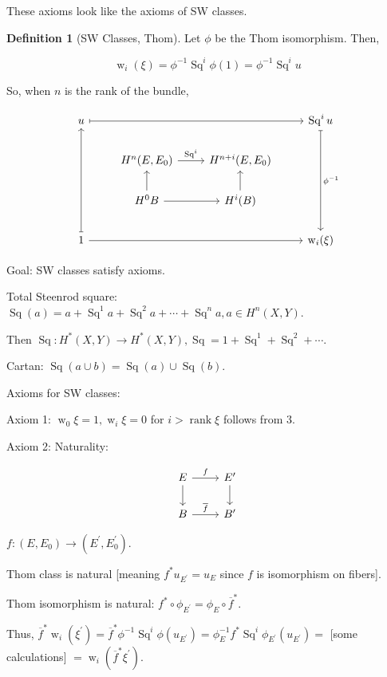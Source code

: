 \documentclass{article}
\theoremstyle{definition}
\newtheorem*{definition}{Definition}
\begin{document}
    These axioms look like the axioms of SW classes.

    \begin{definition}
        [SW Classes, Thom]

        Let \(\phi\) be the Thom isomorphism. Then,

        \[
            \operatorname{w}_i(\xi) = \phi ^{-1} \operatorname{Sq}^i \phi (1) = \phi ^{-1} \operatorname{Sq}^i u
        \]
    \end{definition}

    So, when \(n\) is the rank of the bundle,

    \[
        \begin{tikzcd}
            u \ar[rrr, mapsto] & & & \operatorname{Sq}^i u \ar[ddd, mapsto, "\phi^{-1}"] \\ & H^n(E,E_0) \ar[r,"\operatorname{Sq}^i"] & H^{n+i} (E,E_0) \\ & H^0 B \ar[u] \ar[r] & H^i(B) \ar[u] \\ 1 \ar[uuu, mapsto] \ar[rrr] & & & \operatorname{w}_i(\xi)
        \end{tikzcd}
    \]

    Goal: SW classes satisfy axioms.

    Total Steenrod square: \(\operatorname{Sq}(a) = a + \operatorname{Sq}^1 a + \operatorname{Sq}^2 a + \cdots + \operatorname{Sq}^n a, a \in H^n(X,Y)\).

    Then \(\operatorname{Sq}: H^{\ast} (X,Y) \to H^{\ast} (X,Y), \operatorname{Sq} = 1 + \operatorname{Sq}^1 + \operatorname{Sq}^2 + \cdots\).

    Cartan: \(\operatorname{Sq}(a\cup b) = \operatorname{Sq}(a) \cup \operatorname{Sq}(b)\). 

    Axioms for SW classes:

    Axiom 1: \(\operatorname{w}_0 \xi = 1, \operatorname{w}_i \xi = 0\) for \(i > \operatorname{rank} \xi\) follows from 3.

    Axiom 2: Naturality:

    \[
        \begin{tikzcd}
            E \ar[r,"f"] \ar[d] & E^{\prime} \ar[d] \\ B \ar[r,"\overline{f}"] & B^{\prime}
        \end{tikzcd}
    \]

    \(f: (E,E_0) \to (E^{\prime} , E_0^{\prime})\).

    Thom class is natural [meaning \(f^{\ast} u_{E^{\prime}} = u_E\) since \(f\) is isomorphism on fibers].

    Thom isomorphism is natural: \(f^{\ast} \circ \phi_{E^{\prime}} = \phi_E \circ \overline{f}^{\ast}\).
    
    Thus, \(\overline{f}^{\ast} \operatorname{w}_i(\xi^{\prime}) = \overline{f}^{\ast} \phi ^{-1} \operatorname{Sq}^i \phi(u_{E^{\prime}}) = \phi_E ^{-1} f^{\ast} \operatorname{Sq}^i \phi_{E^{\prime}}(u_{E^{\prime}}) =\) [some calculations] \(=\operatorname{w}_i(\overline{f}^{\ast} \xi ^{\prime} )\).
\end{document}
